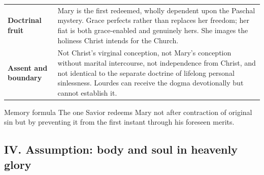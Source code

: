\begin{tabularx}{\textwidth}{@{}>{\raggedright\arraybackslash\bfseries}p{}X@{}}
Doctrinal fruit & Mary is the first redeemed, wholly dependent upon the Paschal mystery. Grace perfects rather than replaces her freedom; her fiat is both grace-enabled and genuinely hers. She images the holiness Christ intends for the Church.\\
Assent and boundary & Not Christ's virginal conception, not Mary's conception without marital intercourse, not independence from Christ, and not identical to the separate doctrine of lifelong personal sinlessness. Lourdes can receive the dogma devotionally but cannot establish it.\\
\bottomrule
\end{tabularx}

\begin{studybox}{Memory formula}
The one Savior redeems Mary not after contraction of original sin but by preventing it from the first instant through his foreseen merits.
\end{studybox}
\endgroup

\clearpage
\subsection*{IV. Assumption: body and soul in heavenly glory}
{}

